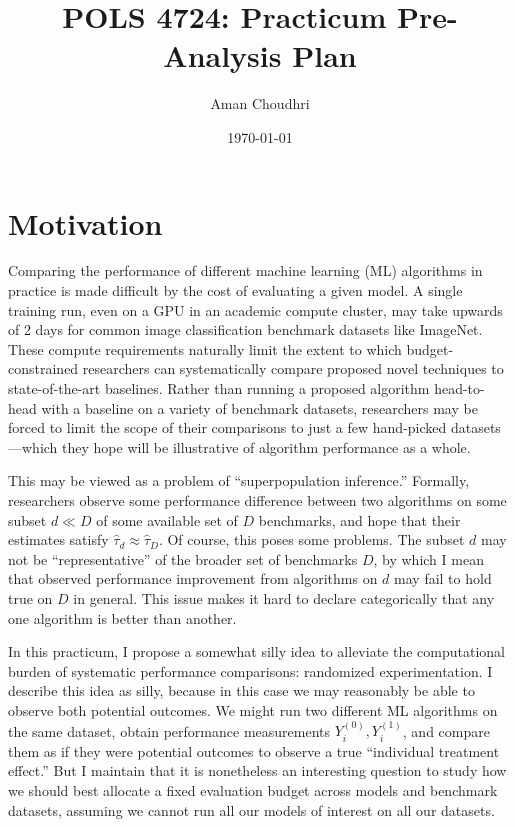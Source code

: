 \documentclass[11pt, oneside]{article}
\title{POLS 4724: Practicum Pre-Analysis Plan}
\author{Aman Choudhri}
\date{\today}
\begin{document}
\maketitle

\section*{Motivation}

Comparing the performance of different machine learning (ML) algorithms in practice
is made difficult by the cost of evaluating a given model. A single training
run, even on a GPU in an academic compute cluster, may take upwards of 2 days
for common image classification benchmark datasets like ImageNet. These compute
requirements naturally limit the extent to which budget-constrained researchers
can systematically compare proposed novel techniques to state-of-the-art
baselines. Rather than running a proposed algorithm head-to-head with a
baseline on a variety of benchmark datasets, researchers may be forced to limit
the scope of their comparisons to just a few hand-picked datasets—which they
hope will be illustrative of algorithm performance as a whole.

This may be viewed as a problem of ``superpopulation inference.'' Formally,
researchers observe some performance difference between two algorithms on some
subset $d \ll D$ of some available set of $D$ benchmarks, and hope that their
estimates satisfy $\hat{\tau}_d \approx \hat{\tau}_D$. Of course, this poses some problems.
The subset $d$ may not be ``representative'' of the broader set of benchmarks $D$, by which
I mean that observed performance improvement from algorithms on $d$ may fail to hold
true on $D$ in general. This issue makes it hard to declare categorically that any
one algorithm is better than another.


In this practicum, I propose a somewhat silly idea to alleviate the
computational burden of systematic performance comparisons: randomized
experimentation. I describe this idea as silly, because in this case we may
reasonably be able to observe both potential outcomes. We might run two
different ML algorithms on the same dataset, obtain performance measurements
$Y_i^{(0)}, Y_i^{(1)}$, and compare them as if they were potential outcomes to
observe a true ``individual treatment effect.'' But I maintain that it is
nonetheless an interesting question to study how we should best allocate a
fixed evaluation budget across models and benchmark datasets, assuming we
cannot run all our models of interest on all our datasets. 
\end{document}

